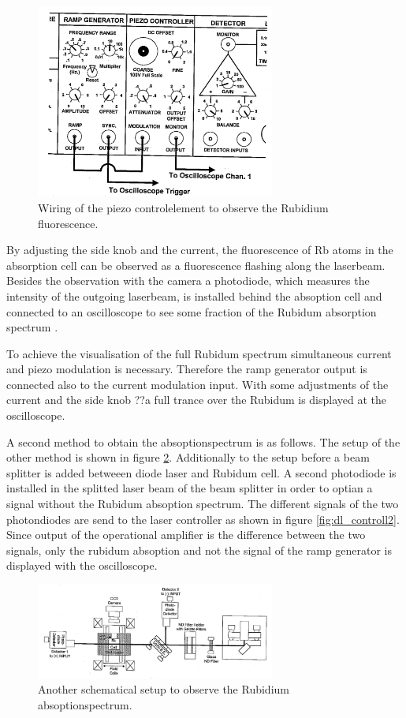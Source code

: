 \begin{figure}
  \centering
  \includegraphics[width=0.7\textwidth]{wiring.png}
  \caption{Wiring of the piezo controlelement to observe the Rubidium fluorescence.\cite{V61}}
  \label{fig:dl_controll}
\end{figure}

By adjusting the side knob and the current,
the fluorescence of Rb atoms in the absorption cell
can be observed
as a fluorescence flashing along the laserbeam.
Besides the observation with the camera a photodiode,
which measures the intensity
of the outgoing laserbeam,
is installed behind the absoption cell and
connected to an oscilloscope to
see some fraction of the Rubidum absorption spectrum .

To achieve the visualisation of the full Rubidum
spectrum
simultaneous current and piezo modulation
is necessary. Therefore the ramp generator output
is connected also to the current modulation input.
With some adjustments of the current and the side knob
??a full trance over the Rubidum is displayed at the  oscilloscope.

A second method to obtain the absoptionspectrum
is as follows.
The setup of the other method is shown in
figure \ref{fig:setup3}.
Additionally to the setup before a beam splitter is added
betweeen diode laser and Rubidum cell.
A second photodiode is installed in the splitted laser beam of the beam splitter
in order to optian a signal without the Rubidum absoption spectrum.
The different signals of the two photondiodes are send to the
laser controller as shown in figure \ref{fig:dl_controll2}.
Since output of the operational amplifier is
the  difference between the two signals,
only the rubidum absoption and not the signal of the ramp generator is
displayed with the oscilloscope.

\begin{figure}
  \centering
  \includegraphics[width=0.7\textwidth]{setup3.png}
  \caption{Another schematical setup to observe the Rubidium absoptionspectrum.\cite{V61}}
  \label{fig:setup3}
\end{figure}


